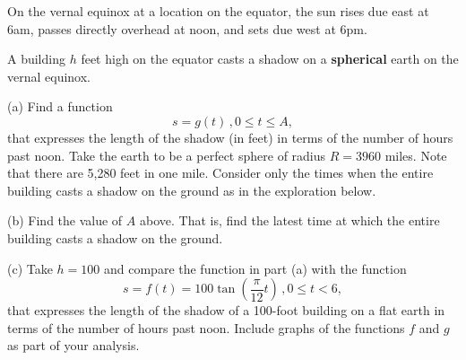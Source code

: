 \documentclass{ximera}
\begin{document}
\begin{question}  \label{Q4:SineCosine}
On the vernal equinox at a location on the equator, the sun rises due east at 6am, passes directly overhead at noon, and sets due west at 6pm. 

A building $h$ feet high on the equator casts a shadow on a {\bf spherical} earth on the vernal equinox. 

(a) Find a function
\[
   s = g(t) \, , 0\leq t \leq A ,
\]
that expresses the length of the shadow (in feet) in terms of the number of hours past noon. Take the earth to be a perfect sphere of radius $R=3960$ miles. Note that there are 5,280 feet in one mile. Consider only the times when the entire building casts a shadow on the ground as in the exploration below.

(b) Find the value of $A$ above. That is, find the latest time at which the entire building casts a shadow on the ground.

(c) Take $h=100$ and compare the function in part (a) with the function 
\[
  s = f(t) = 100 \tan \left( \frac{\pi}{12}t \right) \, , 0\leq t < 6 ,
\]
that expresses the length of the shadow of a 100-foot building on a flat earth in terms of the number of hours past noon. Include graphs of the functions $f$ and $g$ as part of your analysis.

\begin{exploration}

 
\begin{onlineOnly}
    \begin{center}
\end{center}
\end{onlineOnly}
\end{exploration} 

\end{question}
\end{document}

